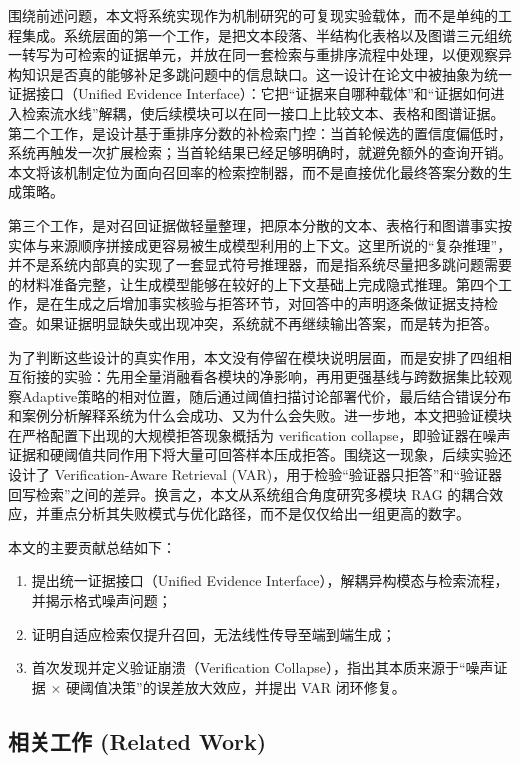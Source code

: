 围绕前述问题，本文将系统实现作为机制研究的可复现实验载体，而不是单纯的工程集成。系统层面的第一个工作，是把文本段落、半结构化表格以及图谱三元组统一转写为可检索的证据单元，并放在同一套检索与重排序流程中处理，以便观察异构知识是否真的能够补足多跳问题中的信息缺口\cite{tapas, tabert}。这一设计在论文中被抽象为统一证据接口（Unified Evidence Interface）：它把“证据来自哪种载体”和“证据如何进入检索流水线”解耦，使后续模块可以在同一接口上比较文本、表格和图谱证据。第二个工作，是设计基于重排序分数的补检索门控：当首轮候选的置信度偏低时，系统再触发一次扩展检索；当首轮结果已经足够明确时，就避免额外的查询开销。本文将该机制定位为面向召回率的检索控制器，而不是直接优化最终答案分数的生成策略\cite{ref11}。

第三个工作，是对召回证据做轻量整理，把原本分散的文本、表格行和图谱事实按实体与来源顺序拼接成更容易被生成模型利用的上下文。这里所说的“复杂推理”，并不是系统内部真的实现了一套显式符号推理器，而是指系统尽量把多跳问题需要的材料准备完整，让生成模型能够在较好的上下文基础上完成隐式推理。第四个工作，是在生成之后增加事实核验与拒答环节，对回答中的声明逐条做证据支持检查\cite{ref24}。如果证据明显缺失或出现冲突，系统就不再继续输出答案，而是转为拒答。

为了判断这些设计的真实作用，本文没有停留在模块说明层面，而是安排了四组相互衔接的实验：先用全量消融看各模块的净影响，再用更强基线与跨数据集比较观察Adaptive策略的相对位置，随后通过阈值扫描讨论部署代价，最后结合错误分布和案例分析解释系统为什么会成功、又为什么会失败。进一步地，本文把验证模块在严格配置下出现的大规模拒答现象概括为 verification collapse，即验证器在噪声证据和硬阈值共同作用下将大量可回答样本压成拒答。围绕这一现象，后续实验还设计了 Verification-Aware Retrieval (VAR)，用于检验“验证器只拒答”和“验证器回写检索”之间的差异。换言之，本文从系统组合角度研究多模块 RAG 的耦合效应，并重点分析其失败模式与优化路径，而不是仅仅给出一组更高的数字。

本文的主要贡献总结如下：
\begin{enumerate}
    \item 提出统一证据接口（Unified Evidence Interface），解耦异构模态与检索流程，并揭示格式噪声问题；
    \item 证明自适应检索仅提升召回，无法线性传导至端到端生成；
    \item 首次发现并定义验证崩溃（Verification Collapse），指出其本质来源于“噪声证据 $\times$ 硬阈值决策”的误差放大效应，并提出 VAR 闭环修复。
\end{enumerate}

\subsection{相关工作 (Related Work)}

